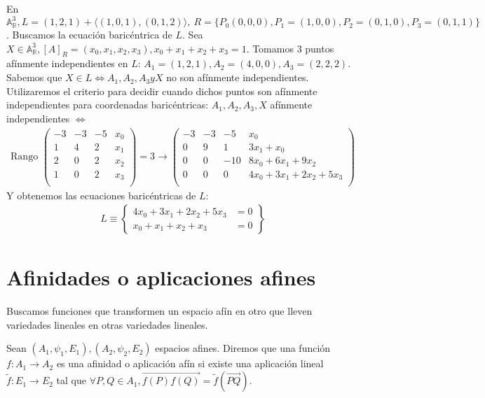 \documentclass[14pt]{book}
\begin{document}
\begin{ej}
	En $\mathbb{A}^3_\mathbb{R}, L = (1, 2, 1) + \langle (1, 0, 1), (0, 1, 2)\rangle,\ R = \{P_0 (0, 0, 0), P_1 = (1, 0, 0), P_2 = (0, 1, 0), P_3 = (0, 1, 1)\}$. Buscamos la ecuación baricéntrica de $L$. Sea $X \in \mathbb{A}^3_\mathbb{R}, [A]_R = (x_0, x_1, x_2, x_3), x_0 + x_1 + x_2 + x_3 = 1$. Tomamos 3 puntos afínmente independientes en $L$: $A_1 = (1, 2, 1), A_2 = (4, 0, 0), A_3 = (2, 2, 2)$. Sabemos que $X \in L \iff A_1, A_2, A_3 y X$ no son afínmente independientes. Utilizaremos el criterio para decidir cuando dichos puntos son afínmente independientes para coordenadas baricéntricas: $A_1, A_2, A_3, X$ afínmente independientes $\iff$
	\begin{align*}
		\text{Rango } \left(
			\begin{array}{cccc}
				-3 & -3 & -5 & x_0 \\
				1  & 4 & 2 & x_1 \\
				2  & 0 & 2 & x_2 \\
				1  & 0 & 2 & x_3 \\
			\end{array}
		\right) = 3 \to 
		\left(\begin{array}{ccc|c}
		-3 & -3 & -5 & x_0 \\
		0  & 9 & 1 & 3x_1 + x_0 \\
		0  & 0 & -10 & 8x_0 + 6x_1 + 9x_2 \\
		0  & 0 & 0 & 4x_0 + 3x_1 + 2x_2 + 5x_3 \\
		\end{array}\right)
	\end{align*}
	Y obtenemos las ecuaciones baricéntricas de $L:$
	\begin{align*}
		L \equiv \left\lbrace\begin{array}{cc}
		4x_0 + 3x_1 + 2x_2 + 5x_3 &= 0\\
		x_0 + x_1 + x_2 + x_3 &= 0
		\end{array}\right\rbrace
	\end{align*}
\end{ej}

\section{Afinidades o aplicaciones afines}
Buscamos funciones que transformen un espacio afín en otro que lleven variedades lineales en otras variedades lineales.

\begin{dfn}
	Sean $(A_1, \psi_1, E_1), (A_2, \psi_2, E_2)$ espacios afines. Diremos que una función $f: A_1 \to A_2$ es una afinidad o aplicación afín si existe una aplicación lineal $\tilde{f} : E_1 \to E_2$ tal que $\forall P, Q \in A_1, \overrightarrow{f(P) f(Q)} = \tilde{f}(\overrightarrow{PQ})$.
\end{dfn}
\end{document}
